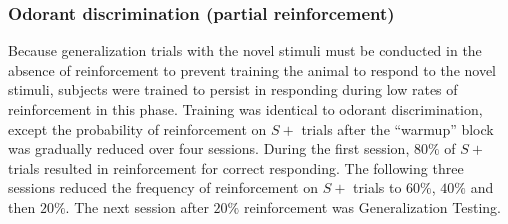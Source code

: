 \subsubsection*{Odorant discrimination (partial reinforcement)}
\label{sec:methods_discrimination}
Because generalization trials with the novel stimuli must be conducted in the absence of reinforcement to prevent training the animal to respond to the novel stimuli, subjects were trained to persist in responding during low rates of reinforcement in this phase. Training was identical to odorant discrimination, except the probability of reinforcement on $S+$ trials after the ``warmup'' block was gradually reduced over four sessions. During the first session, $80\%$ of $S+$ trials resulted in reinforcement for correct responding. The following three sessions reduced the frequency of reinforcement on $S+$ trials to $60\%$, $40\%$ and then $20\%$. The next session after $20\%$ reinforcement was Generalization Testing.


